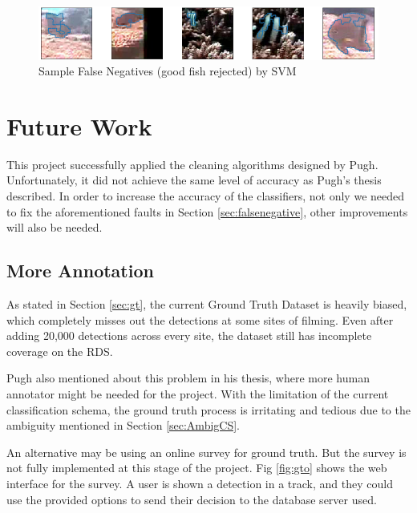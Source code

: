 \documentclass[bsc,logo,twoside,fullspacing,parskip]{infthesis}
\begin{document}
\begin{figure}[h]
    \centering
    \includegraphics[scale=0.40]{graph/SVMfail.png}
    \caption{Sample False Negatives (good fish rejected) by SVM}
    \label{fig:SVMfail}
\end{figure}

\section{Future Work}
\label{sec:future}

This project successfully applied the cleaning algorithms designed by Pugh\cite{Pugh}. 
Unfortunately, it did not achieve the same level of accuracy as Pugh's thesis described.
In order to increase the accuracy of the classifiers, not only we needed to fix the aforementioned faults in Section \ref{sec:falsenegative}, other improvements will also be needed.

\subsection{More Annotation}

As stated in Section \ref{sec:gt}, the current Ground Truth Dataset is heavily biased, which completely misses out the detections at some sites of filming. 
Even after adding 20,000 detections across every site, the dataset still has incomplete coverage on the RDS. 

Pugh also mentioned about this problem in his thesis, where more human annotator might be needed for the project.
With the limitation of the current classification schema, the ground truth process is irritating and tedious due to the ambiguity mentioned in Section \ref{sec:AmbigCS}.

An alternative may be using an online survey for ground truth. 
But the survey is not fully implemented at this stage of the project. 
Fig \ref{fig:gto} shows the web interface for the survey.
A user is shown a detection in a track, and they could use the provided options to send their decision to the database server used.
\end{document}
